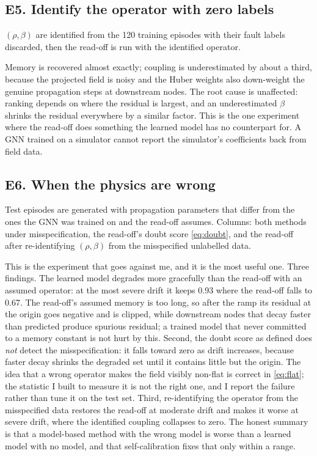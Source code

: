 \documentclass[11pt,a4paper]{article}
\begin{document}
\subsection*{E5. Identify the operator with zero labels}
$(\rho,\beta)$ are identified from the 120 training episodes with their fault labels discarded, then
the read-off is run with the identified operator.

Memory is recovered almost exactly; coupling is underestimated by about a third, because the
projected field is noisy and the Huber weights also down-weight the genuine propagation steps at
downstream nodes. The root cause is unaffected: ranking depends on where the residual is largest,
and an underestimated $\beta$ shrinks the residual everywhere by a similar factor. This is the one
experiment where the read-off does something the learned model has no counterpart for. A GNN
trained on a simulator cannot report the simulator's coefficients back from field data.

\subsection*{E6. When the physics are wrong}
Test episodes are generated with propagation parameters that differ from the ones the GNN was
trained on and the read-off assumes. Columns: both methods under misspecification, the read-off's
doubt score \eqref{eq:doubt}, and the read-off after re-identifying $(\rho,\beta)$ from the
misspecified unlabelled data.

This is the experiment that goes against me, and it is the most useful one. Three findings. The
learned model degrades more gracefully than the read-off with an assumed operator: at the most
severe drift it keeps 0.93 where the read-off falls to 0.67. The read-off's assumed memory is too
long, so after the ramp its residual at the origin goes negative and is clipped, while downstream
nodes that decay faster than predicted produce spurious residual; a trained model that never
committed to a memory constant is not hurt by this. Second, the doubt score as defined does
\emph{not} detect the misspecification: it falls toward zero as drift increases, because faster
decay shrinks the degraded set until it contains little but the origin. The idea that a wrong
operator makes the field visibly non-flat is correct in \eqref{eq:flat}; the statistic I built to
measure it is not the right one, and I report the failure rather than tune it on the test set.
Third, re-identifying the operator from the misspecified data restores the read-off at moderate
drift and makes it worse at severe drift, where the identified coupling collapses to zero. The
honest summary is that a model-based method with the wrong model is worse than a learned model
with no model, and that self-calibration fixes that only within a range.
\end{document}
